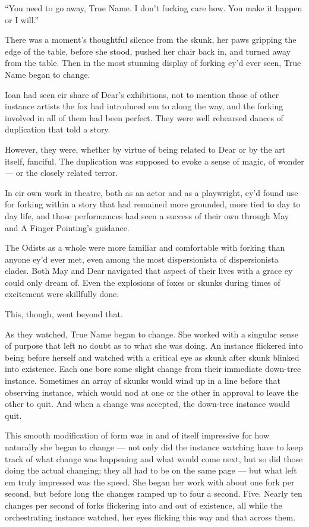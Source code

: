 ``You need to go away, True Name. I don't fucking care how. You make it happen or I will.''

There was a moment's thoughtful silence from the skunk, her paws gripping the edge of the table, before she stood, pushed her chair back in, and turned away from the table. Then in the most stunning display of forking ey'd ever seen, True Name began to change.

Ioan had seen eir share of Dear's exhibitions, not to mention those of other instance artists the fox had introduced em to along the way, and the forking involved in all of them had been perfect. They were well rehearsed dances of duplication that told a story.

However, they were, whether by virtue of being related to Dear or by the art itself, fanciful. The duplication was supposed to evoke a sense of magic, of wonder — or the closely related terror.

In eir own work in theatre, both as an actor and as a playwright, ey'd found use for forking within a story that had remained more grounded, more tied to day to day life, and those performances had seen a success of their own through May and A Finger Pointing's guidance.

The Odists as a whole were more familiar and comfortable with forking than anyone ey'd ever met, even among the most dispersionista of dispersionista clades. Both May and Dear navigated that aspect of their lives with a grace ey could only dream of. Even the explosions of foxes or skunks during times of excitement were skillfully done.

This, though, went beyond that.

As they watched, True Name began to change. She worked with a singular sense of purpose that left no doubt as to what she was doing. An instance flickered into being before herself and watched with a critical eye as skunk after skunk blinked into existence. Each one bore some slight change from their immediate down-tree instance. Sometimes an array of skunks would wind up in a line before that observing instance, which would nod at one or the other in approval to leave the other to quit. And when a change was accepted, the down-tree instance would quit.

This smooth modification of form was in and of itself impressive for how naturally she began to change — not only did the instance watching have to keep track of what change was happening and what would come next, but so did those doing the actual changing; they all had to be on the same page — but what left em truly impressed was the speed. She began her work with about one fork per second, but before long the changes ramped up to four a second. Five. Nearly ten changes per second of forks flickering into and out of existence, all while the orchestrating instance watched, her eyes flicking this way and that across them.

